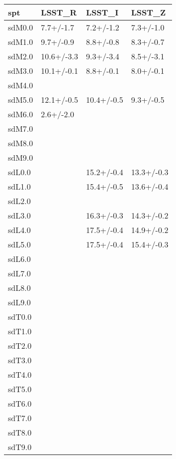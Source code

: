 \begin{tabular}{llll}
\toprule
   spt &     LSST\_R &     LSST\_I &     LSST\_Z \\
\midrule
sdM0.0 &  7.7+/-1.7 &  7.2+/-1.2 &  7.3+/-1.0 \\
sdM1.0 &  9.7+/-0.9 &  8.8+/-0.8 &  8.3+/-0.7 \\
sdM2.0 & 10.6+/-3.3 &  9.3+/-3.4 &  8.5+/-3.1 \\
sdM3.0 & 10.1+/-0.1 &  8.8+/-0.1 &  8.0+/-0.1 \\
sdM4.0 &            &            &            \\
sdM5.0 & 12.1+/-0.5 & 10.4+/-0.5 &  9.3+/-0.5 \\
sdM6.0 &  2.6+/-2.0 &            &            \\
sdM7.0 &            &            &            \\
sdM8.0 &            &            &            \\
sdM9.0 &            &            &            \\
sdL0.0 &            & 15.2+/-0.4 & 13.3+/-0.3 \\
sdL1.0 &            & 15.4+/-0.5 & 13.6+/-0.4 \\
sdL2.0 &            &            &            \\
sdL3.0 &            & 16.3+/-0.3 & 14.3+/-0.2 \\
sdL4.0 &            & 17.5+/-0.4 & 14.9+/-0.2 \\
sdL5.0 &            & 17.5+/-0.4 & 15.4+/-0.3 \\
sdL6.0 &            &            &            \\
sdL7.0 &            &            &            \\
sdL8.0 &            &            &            \\
sdL9.0 &            &            &            \\
sdT0.0 &            &            &            \\
sdT1.0 &            &            &            \\
sdT2.0 &            &            &            \\
sdT3.0 &            &            &            \\
sdT4.0 &            &            &            \\
sdT5.0 &            &            &            \\
sdT6.0 &            &            &            \\
sdT7.0 &            &            &            \\
sdT8.0 &            &            &            \\
sdT9.0 &            &            &            \\
\bottomrule
\end{tabular}
